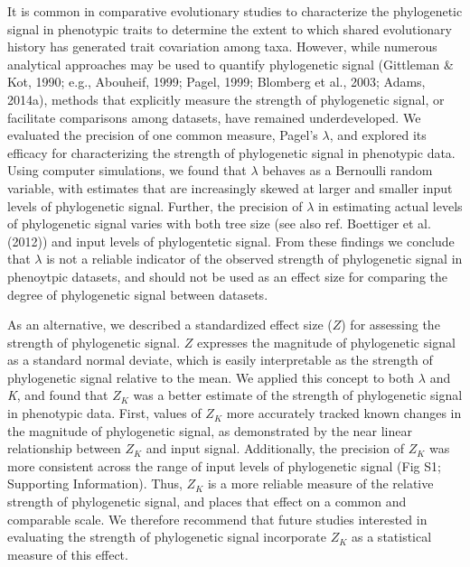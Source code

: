 \documentclass[
]{article}
\begin{document}
It is common in comparative evolutionary studies to characterize the
phylogenetic signal in phenotypic traits to determine the extent to
which shared evolutionary history has generated trait covariation among
taxa. However, while numerous analytical approaches may be used to
quantify phylogenetic signal (Gittleman \& Kot, 1990; e.g., Abouheif,
1999; Pagel, 1999; Blomberg et al., 2003; Adams, 2014a), methods that
explicitly measure the strength of phylogenetic signal, or facilitate
comparisons among datasets, have remained underdeveloped. We evaluated
the precision of one common measure, Pagel's \(\lambda\), and explored
its efficacy for characterizing the strength of phylogenetic signal in
phenotypic data. Using computer simulations, we found that \(\lambda\)
behaves as a Bernoulli random variable, with estimates that are
increasingly skewed at larger and smaller input levels of phylogenetic
signal. Further, the precision of \(\lambda\) in estimating actual
levels of phylogenetic signal varies with both tree size (see also ref.
Boettiger et al. (2012)) and input levels of phylogentetic signal. From
these findings we conclude that \(\lambda\) is not a reliable indicator
of the observed strength of phylogenetic signal in phenoytpic datasets,
and should not be used as an effect size for comparing the degree of
phylogenetic signal between datasets. \hfill\break

As an alternative, we described a standardized effect size (\(Z\)) for
assessing the strength of phylogenetic signal. \(Z\) expresses the
magnitude of phylogenetic signal as a standard normal deviate, which is
easily interpretable as the strength of phylogenetic signal relative to
the mean. We applied this concept to both \(\lambda\) and \emph{K}, and
found that \(Z_K\) was a better estimate of the strength of phylogenetic
signal in phenotypic data. First, values of \(Z_K\) more accurately
tracked known changes in the magnitude of phylogenetic signal, as
demonstrated by the near linear relationship between \(Z_K\) and input
signal. Additionally, the precision of \(Z_K\) was more consistent
across the range of input levels of phylogenetic signal (Fig S1;
Supporting Information). Thus, \(Z_K\) is a more reliable measure of the
relative strength of phylogenetic signal, and places that effect on a
common and comparable scale. We therefore recommend that future studies
interested in evaluating the strength of phylogenetic signal incorporate
\(Z_K\) as a statistical measure of this effect. \hfill\break
\end{document}
